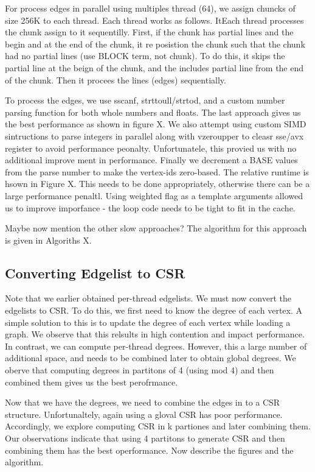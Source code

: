 For process edges in parallel using multiples thread (64), we assign chuncks of size 256K to each thread. Each thread works as follows. ItEach thread processes the chunk assign to it sequentilly. First, if the chunk has partial lines and the begin and at the end of the chunk, it re posistion the chunk such that the chunk had no partial lines (use BLOCK term, not chunk). To do this, it skips the partial line at the beign of the chunk, and the includes partial line from the end of the chunk. Then it procees the lines (edges) sequentially.

To process the edges, we use sscanf, strttoull/strtod, and a custom number parsing function for both whole numbers and floats. The last approach gives us the best performance as shown in figure X. We also attempt using custom SIMD sintructions to parse integers in parallel along with vzeroupper to cleasr sse/avx register to avoid performance peonalty. Unfortunatele, this provied us with no additional improve ment in performance. Finally we decrement a BASE values from the parse number to make the vertex-ids zero-based. The relative runtime is hsown in Figure X. This needs to be done appropriately, otherwise there can be a large performance penaltl. Using weighted flag as a template arguments allowed us to improve imporfance - the loop code needs to be tight to fit in the cache.

Maybe now mention the other slow approaches?
The algorithm for this approach is given in Algoriths X.









\subsection{Converting Edgelist to CSR}

Note that we earlier obtained per-thread edgelists. We must now convert the edgelists to CSR. To do this, we first need to know the degree of each vertex. A simple solution to this is to update the degree of each vertex while loading a graph. We observe that this relsults in high contention and impact performance. In contrast, we can compute per-thread degrees. However, this a large number of additional space, and needs to be combined later to obtain global degrees. We oberve that computing degrees in partitons of 4 (using mod 4) and then combined them gives us the best perofrmance.

Now that we have the degrees, we need to combine the edges in to a CSR structure. Unfortunaltely, again using a gloval CSR has poor performance. Accordingly, we explore computing CSR in k partiones and later combining them. Our observations indicate that using 4 partitons to generate CSR and then combining them has the best operformance. Now describe the figures and the algorithm.





